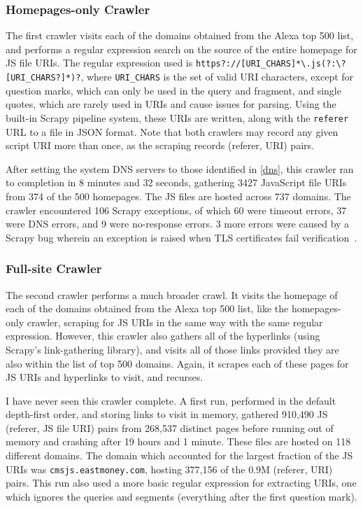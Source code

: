 \subsubsection*{Homepages-only Crawler}\label{homepages-crawler}
The first crawler visits each of the domains obtained from the Alexa top 500 list, and performs a regular expression search on the source of the entire homepage for JS file URIs.
The regular expression used is \texttt{https?://[URI\_CHARS]*\textbackslash{}.js\allowbreak{}(?:\textbackslash{}?[URI\_CHARS?]*)?}, where \texttt{URI\_CHARS} is the set of valid URI characters, except for question marks, which can only be used in the query and fragment, and single quotes, which are rarely used in URIs and cause issues for parsing.
Using the built-in Scrapy pipeline system, these URIs are written, along with the \texttt{referer} URL to a file in JSON format.
Note that both crawlers may record any given script URI more than once, as the scraping records (referer, URI) pairs.

After setting the system DNS servers to those identified in \autoref{dns}, this crawler ran to completion in 8 minutes and 32 seconds, gathering 3427 JavaScript file URIs from 374 of the 500 homepages.
The JS files are hosted across 737 domains.
The crawler encountered 106 Scrapy exceptions, of which 60 were timeout errors, 37 were DNS errors, and 9 were no-response errors.
3 more errors were caused by a Scrapy bug wherein an exception is raised when TLS certificates fail verification~\cite{Calderone2015}.
\subsubsection*{Full-site Crawler}\label{full-crawler}
The second crawler performs a much broader crawl.
It visits the homepage of each of the domains obtained from the Alexa top 500 list, like the homepages-only crawler, scraping for JS URIs in the same way with the same regular expression.
However, this crawler also gathers all of the hyperlinks (using Scrapy's link-gathering library), and visits all of those links provided they are also within the list of top 500 domains.
Again, it scrapes each of these pages for JS URIs and hyperlinks to visit, and recurses.

I have never seen this crawler complete.
A first run, performed in the default depth-first order, and storing links to visit in memory, gathered 910,490 JS (referer, JS file URI) pairs from 268,537 distinct pages before running out of memory and crashing after 19 hours and 1 minute.
These files are hosted on 118 different domains.
The domain which accounted for the largest fraction of the JS URIs was \texttt{cmsjs.eastmoney.com}, hosting 377,156 of the 0.9M (referer, URI) pairs.
This run also used a more basic regular expression for extracting URIs, one which ignores the queries and segments (everything after the first question mark).

